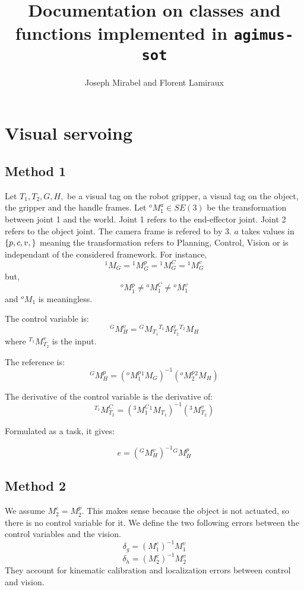 \documentclass{article}
\title{Documentation on classes and functions implemented in \texttt{agimus-sot}}
\author{Joseph Mirabel and Florent Lamiraux}
\date{}
\newcommand{\oM}[2]{M^{#1}_{#2}}
\newcommand{\oMinv}[2]{{\left( \oM{#1}{#2} \right) }^{-1}}
\begin{document}
\maketitle

\section{Visual servoing}

\subsection{Method 1}

Let $T_1, T_2, G, H, $ be a visual tag on the robot gripper,
a visual tag on the object, the gripper and the handle frames.
Let ${^o}M^a_1 \in SE(3)$ be the transformation between joint 1 and the world.
Joint 1 refers to the end-effector joint.
Joint 2 refers to the object joint.
The camera frame is refered to by 3.
$a$ takes values in $\left\{ p, c, v, \empty \right\}$
meaning the transformation refers to Planning, Control, Vision or is independant of the considered framework.
For instance, $$ {^1}M_G = {^1}M^p_G = {^1}M^C_G = {^1}M^v_G $$
but, $$ {^o}M^p_1 \neq {^o}M^C_1 \neq {^o}M^v_1 $$ and ${^o}M_1 $ is meaningless.

The control variable is:
$$ {^G}M^v_H = {^G}M_{T_1} {^{T_1}}M^v_{T_2} {^{T_2}}M_H $$
where ${^{T_1}}M^v_{T_2} $ is the input.

The reference is:
$$ {^G}M^p_H = \left( {^o}M^p_{1} {^1}M_{G} \right)^{-1} \left( {^o}M^p_{2} {^2}M_{H} \right) $$

The derivative of the control variable is the derivative of:
$$ {^{T_1}}M^C_{T_2} = \left( {^3}M^C_{1} {^1}M_{T_1} \right)^{-1} \left( {^3}M^v_{T_2} \right) $$

Formulated as a task, it gives:

$$ e = \left( {^G}M^v_H \right)^{-1} {^G}M^p_H $$

\subsection{Method 2}

We assume $\oM{c}{2} = \oM{p}{2} $. This makes sense because the object is not actuated, so there is no control variable for it.
We define the two following errors between the control variables and the vision.
$$ \delta_g = \oMinv{c}{1} \oM{v}{1} $$
$$ \delta_h = \oMinv{c}{2} \oM{v}{2} $$
They account for kinematic calibration and localization errors between control and vision.
\end{document}
